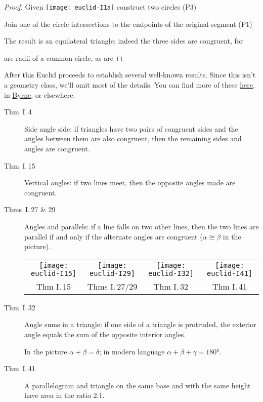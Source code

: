 \begin{proof}
	Given \texttt{[image: euclid-I1a]} construct two circles (P3)\quad{}\par\vspace{-23pt}
	Join one of the circle intersections to the endpoints of the original segment (P1)\quad {}\par\vspace{-11pt}
	The result is an equilateral triangle; indeed the three sides are congruent, for\par {} are radii of a common circle,
	as are 
\end{proof}

\goodbreak

After this Euclid proceeds to establish several well-known results. Since this isn't a geometry class, we'll omit most of the details. You can find more of these \href{http://math.uci.edu/~ndonalds/math161/euclid.pdf}{here,} in \href{http://math.uci.edu/~ndonalds/Elements-I-VI.pdf}{Byrne,} or elsewhere.

\begin{description}
  \item[\normalfont Thm\ I.\,4] Side angle side: if triangles have two pairs of congruent sides and the angles between them are also congruent, then the remaining sides and angles are congruent.
  \item[\normalfont Thm\ I.\,15] Vertical angles: if two lines meet, then the opposite angles made are congruent.
  \item[\normalfont Thms\ I.\,27 \& 29] Angles and parallels: if a line falls on two other lines, then the two lines are parallel if and only if the alternate angles are congruent ($\alpha\cong \beta$ in the picture).
  \begin{center}
	  \begin{tabular}{@{}c@{\qquad}c@{\quad}c@{\quad}c@{}}
		  \texttt{[image: euclid-I15]}
		  &
		  \texttt{[image: euclid-I29]}
		  &
		  \texttt{[image: euclid-I32]}
		  &
		  \texttt{[image: euclid-I41]}
		  \\
		  Thm I.\,15
		  &
		  Thms I.\,27/29
		  &
		  Thm I.\,32
		  &
		  Thm I.\,41
	  \end{tabular}
  \end{center}
  \item[\normalfont Thm\ I.\,32] Angle sums in a triangle: if one side of a triangle is protruded, the exterior angle equals the sum of the opposite interior angles.\par
  In the picture $\alpha+\beta=\delta$; in modern language $\alpha+\beta+\gamma=\ang{180}$.
  \item[\normalfont Thm\ I.\,41] A parallelogram and triangle on the same base and with the same height have area in the ratio 2:1.
\end{description}

